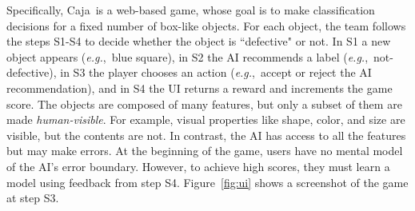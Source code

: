 \documentclass[letterpaper]{article} %
\newcommand{\bug}
    {\mbox{\rule{2mm}{2mm}}}
\newcommand{\Bug}[1]
    {\bug \footnote{BUG: {#1}}}
\newcommand{\eg}{\mbox{\it e.g.}}
\newcommand{\?}{\mbox{?}}
\newcommand{\plat}{{\sc Caja}}
\begin{document}


Specifically, \plat\ is a web-based game, whose goal is to make classification decisions for a fixed number of box-like objects.  For each object, the team follows the steps S1-S4 to decide whether the object is ``defective" or not. In S1 a new object appears (\eg,\ blue square), in S2 the AI recommends a label (\eg,\ not-defective), in S3 the player chooses an action (\eg,\ accept or reject the AI recommendation), and in S4 the UI returns a reward and increments the game score. The objects are composed of many features, but only a subset of them are made {\em human-visible}.
For example, visual properties like shape, color, and size are visible, but the contents are not. In contrast, the AI has access to all the features but 
may make errors. At the beginning of the game, users have no mental model of the AI's error boundary. However, to achieve high scores, they must learn a model using feedback from step S4. Figure~\ref{fig:ui} shows a screenshot of the game at step S3. %
\end{document}
